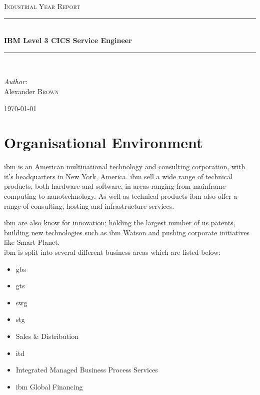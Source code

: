\documentclass[a4paper,11pt]{report}
\newcommand{\HRule}{\rule{\linewidth}{0.5mm}}
\begin{document}
\begin{titlepage}

\begin{center}



\textsc{\Large Industrial Year Report}\\[0.5cm]


\HRule \\[0.4cm]
{ \huge \bfseries IBM Level 3 CICS Service Engineer}\\[0.4cm]

\HRule \\[1.5cm]

\begin{minipage}{0.4\textwidth}
\begin{flushleft} \large
\emph{Author:}\\
Alexander \textsc{Brown}
\end{flushleft}
\end{minipage}

\vfill

{\large \today}

\end{center}

\end{titlepage}

\tableofcontents

\chapter{Organisational Environment}

\Gls{ibm} is an American multinational technology and consulting corporation, with it's headquarters
in New York, America. \Gls{ibm} sell a wide range of technical products, both hardware and
software, in areas ranging from mainframe computing to nanotechnology. As well as technical 
products \gls{ibm} also offer a range of consulting, hosting and infrastructure services.

\Gls{ibm} are also know for innovation; holding the largest number of \gls{us} patents, building
new technologies such as \gls{ibm} Watson and pushing corporate initiatives like Smart Planet. \\



\Gls{ibm} is split into several different business areas which are listed below:

\begin{itemize}
\item \Gls{gbs}
\item \Gls{gts}
\item \Gls{swg}
\item \Gls{stg}
\item Sales \& Distribution
\item \Gls{itd}
\item Integrated Managed Business Process Services
\item \Gls{ibm} Global Financing
\end{itemize}
\end{document}
